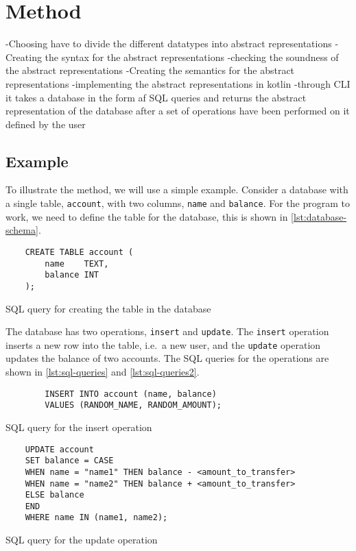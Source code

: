 \section{Method}
\label{sec:method}
-Choosing have to divide the different datatypes into abstract representations
-Creating the syntax for the abstract representations
-checking the soundness of the abstract representations
-Creating the semantics for the abstract representations
-implementing the abstract representations in kotlin
-through CLI it takes a database in the form af SQL queries and returns the abstract representation of the database after a set of operations have been performed on it defined by the user

\subsection{Example}\label{subsec:example}
To illustrate the method, we will use a simple example.
Consider a database with a single table, \texttt{account}, with two columns, \texttt{name} and \texttt{balance}.
For the program to work, we need to define the table for the database, this is shown in \autoref{lst:database-schema}.


\begin{listing}[htb!]
    \begin{verbatim}
    CREATE TABLE account (
        name    TEXT,
        balance INT
    );
    \end{verbatim}
    \caption{SQL query for creating the table in the database}
    \label{lst:database-schema}
\end{listing}


The database has two operations, \texttt{insert} and \texttt{update}.
The \texttt{insert} operation inserts a new row into the table, i.e.\ a new user, and the \texttt{update} operation updates the balance of two accounts.
The SQL queries for the operations are shown in \autoref{lst:sql-queries} and \autoref{lst:sql-queries2}.


\begin{listing}[htb!]
    \begin{verbatim}
        INSERT INTO account (name, balance)
        VALUES (RANDOM_NAME, RANDOM_AMOUNT);
    \end{verbatim}
    \caption{SQL query for the insert operation}
    \label{lst:sql-queries}
\end{listing}


\begin{listing}[htb!]
    \begin{verbatim}
    UPDATE account
    SET balance = CASE
    WHEN name = "name1" THEN balance - <amount_to_transfer>
    WHEN name = "name2" THEN balance + <amount_to_transfer>
    ELSE balance
    END
    WHERE name IN (name1, name2);
    \end{verbatim}
    \caption{SQL query for the update operation}
    \label{lst:sql-queries2}
\end{listing}


